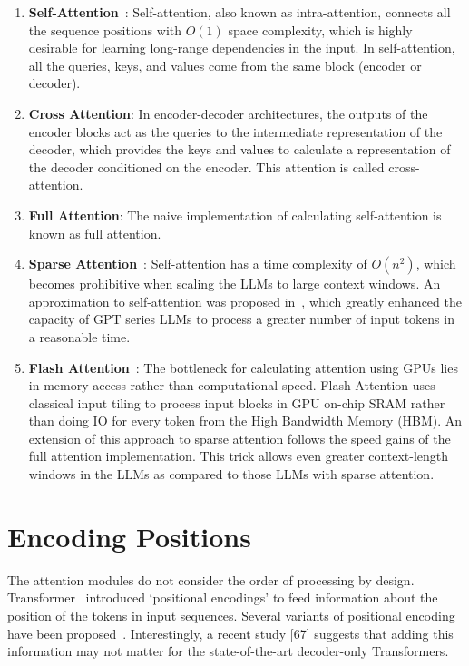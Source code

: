 \documentclass[a4paper,oneside]{book}
\begin{document}
\begin{enumerate}
    \item \textbf{Self-Attention}~\cite{vaswani2017attention}: Self-attention, also known as intra-attention, connects all the sequence positions with $O(1)$ space complexity, which is highly desirable for learning long-range dependencies in the input. In self-attention, all the queries, keys, and values come from the same block (encoder or decoder).

    \item \textbf{Cross Attention}: In encoder-decoder architectures, the outputs of the encoder blocks act as the queries to the intermediate representation of the decoder, which provides the keys and values to calculate a representation of the decoder conditioned on the encoder. This attention is called cross-attention.

    \item \textbf{Full Attention}: The naive implementation of calculating self-attention is known as full attention.

    \item \textbf{Sparse Attention}~\cite{child2019generating}: Self-attention has a time complexity of $O(n^2)$, which becomes prohibitive when scaling the LLMs to large context windows. An approximation to self-attention was proposed in~\cite{child2019generating}, which greatly enhanced the capacity of GPT series LLMs to process a greater number of input tokens in a reasonable time.

    \item \textbf{Flash Attention}~\cite{dao2022flashattention}: The bottleneck for calculating attention using GPUs lies in memory access rather than computational speed. Flash Attention uses classical input tiling to process input blocks in GPU on-chip SRAM rather than doing IO for every token from the High Bandwidth Memory (HBM). An extension of this approach to sparse attention follows the speed gains of the full attention implementation. This trick allows even greater context-length windows in the LLMs as compared to those LLMs with sparse attention.
\end{enumerate}

\section{Encoding Positions}
The attention modules do not consider the order of processing by design. Transformer~\cite{vaswani2017attention} introduced `positional encodings' to feed information about the position of the tokens in input sequences. Several variants of positional encoding have been proposed~\cite{press2021train, su2024roformer}. Interestingly, a recent study [67] suggests that adding this information may not matter for the state-of-the-art decoder-only Transformers.
\end{document}
